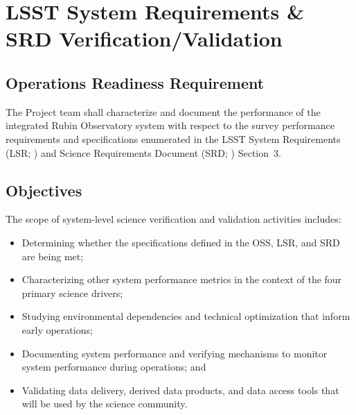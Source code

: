 \section{LSST System Requirements \& SRD Verification/Validation}  \label{sec:srd}

\subsection{Operations Readiness Requirement}
The Project team shall characterize and document the performance of the integrated Rubin Observatory system with respect to the survey performance requirements and specifications enumerated in the LSST System Requirements (LSR; ) and Science Requirements Document (SRD; ) Section~3.

\subsection{Objectives}


The scope of system-level science verification and validation activities includes:

\begin{itemize}
	\item Determining whether the specifications defined in the OSS, LSR, and SRD are being met;
	\item Characterizing other system performance metrics in the context of the four primary science drivers;
	\item Studying environmental dependencies and technical optimization that inform early operations;
	\item Documenting system performance and verifying mechanisms to monitor system performance during operations; and
	\item Validating data delivery, derived data products, and data access tools that will be used by the science community.
\end{itemize}

